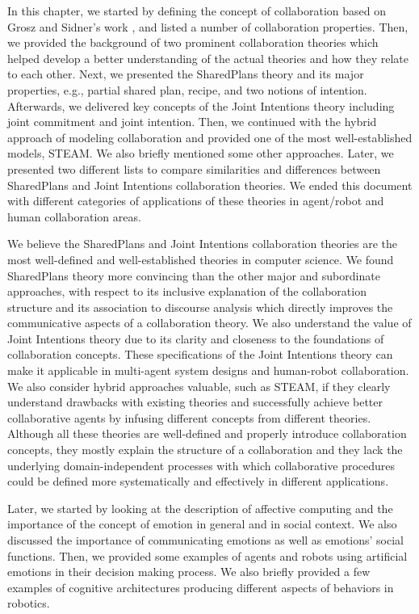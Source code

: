 \documentclass[12pt]{report}
\begin{document}
In this chapter, we started by defining the concept of collaboration based
on Grosz and Sidner's work \cite{grosz:plans-discourse}, and listed a number of
collaboration properties. Then, we provided the background of two prominent
collaboration theories which helped develop a better understanding of the actual
theories and how they relate to each other. Next, we presented the SharedPlans
theory and its major properties, e.g., partial shared plan, recipe, and two
notions of intention. Afterwards, we delivered key concepts of the Joint
Intentions theory including joint commitment and joint intention. Then, we
continued with the hybrid approach of modeling collaboration and provided one of
the most well-established models, STEAM. We also briefly mentioned some other
approaches. Later, we presented two different lists to compare similarities and
differences between SharedPlans and Joint Intentions collaboration theories. We
ended this document with different categories of applications of these theories
in agent/robot and human collaboration areas.

We believe the SharedPlans and Joint Intentions collaboration theories are the
most well-defined and well-established theories in computer science. We found
SharedPlans theory more convincing than the other major and subordinate
approaches, with respect to its inclusive explanation of the collaboration
structure and its association to discourse analysis which directly improves the
communicative aspects of a collaboration theory. We also understand the value of
Joint Intentions theory due to its clarity and closeness to the foundations of
collaboration concepts. These specifications of the Joint Intentions theory can
make it applicable in multi-agent system designs and human-robot collaboration.
We also consider hybrid approaches valuable, such as STEAM, if they clearly
understand drawbacks with existing theories and successfully achieve better
collaborative agents by infusing different concepts from different theories.
Although all these theories are well-defined and properly introduce
collaboration concepts, they mostly explain the structure of a collaboration and
they lack the underlying domain-independent processes with which collaborative
procedures could be defined more systematically and effectively in different
applications.

Later, we started by looking at the description of affective computing and the
importance of the concept of emotion in general and in social context. We also
discussed the importance of communicating emotions as well as emotions' social
functions. Then, we provided some examples of agents and robots using artificial
emotions in their decision making process. We also briefly provided a few
examples of cognitive architectures producing different aspects of behaviors in
robotics.
\end{document}
